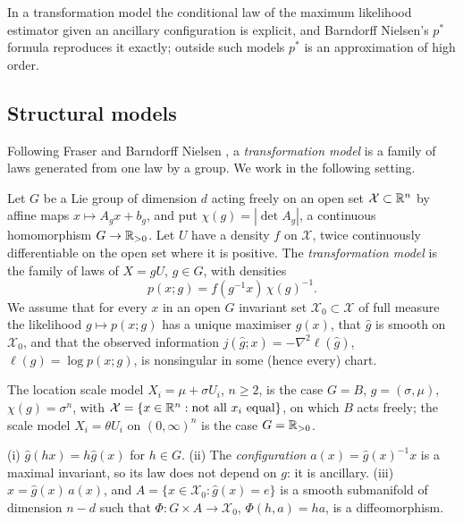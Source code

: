 In a transformation model the conditional law of the maximum likelihood estimator given an ancillary configuration is explicit, and Barndorff Nielsen's $p^*$ formula reproduces it exactly; outside such models $p^*$ is an approximation of high order.

\subsection{Structural models}

Following Fraser \cite{fraser1968} and Barndorff Nielsen \cite{barndorffnielsen1983,barndorffnielsencox1994}, a \emph{transformation model} is a family of laws generated from one law by a group. We work in the following setting.

\begin{definition}\label{def:11bmodel}
Let $G$ be a Lie group of dimension $d$ acting freely on an open set $\mathcal X\subset\mathbb{R}^n$ by affine maps $x\mapsto A_gx+b_g$, and put $\chi(g)=|\det A_g|$, a continuous homomorphism $G\to\mathbb{R}_{>0}$. Let $U$ have a density $f$ on $\mathcal X$, twice continuously differentiable on the open set where it is positive. The \emph{transformation model} is the family of laws of $X=gU$, $g\in G$, with densities
\[
p(x;g)=f(g^{-1}x)\,\chi(g)^{-1}.
\]
We assume that for every $x$ in an open $G$ invariant set $\mathcal X_0\subset\mathcal X$ of full measure the likelihood $g\mapsto p(x;g)$ has a unique maximiser $\hat g(x)$, that $\hat g$ is smooth on $\mathcal X_0$, and that the observed information $j(\hat g;x)=-\nabla^2\ell(\hat g)$, $\ell(g)=\log p(x;g)$, is nonsingular in some (hence every) chart.
\end{definition}

The location scale model $X_i=\mu+\sigma U_i$, $n\ge2$, is the case $G=B$, $g=(\sigma,\mu)$, $\chi(g)=\sigma^n$, with $\mathcal X=\{x\in\mathbb{R}^n:\text{not all }x_i\text{ equal}\}$, on which $B$ acts freely; the scale model $X_i=\theta U_i$ on $(0,\infty)^n$ is the case $G=\mathbb{R}_{>0}$.

\begin{lemma}\label{thm:11bconfig}
(i) $\hat g(hx)=h\hat g(x)$ for $h\in G$. (ii) The \emph{configuration} $a(x)=\hat g(x)^{-1}x$ is a maximal invariant, so its law does not depend on $g$: it is ancillary. (iii) $x=\hat g(x)\,a(x)$, and $A=\{x\in\mathcal X_0:\hat g(x)=e\}$ is a smooth submanifold of dimension $n-d$ such that $\Phi:G\times A\to\mathcal X_0$, $\Phi(h,a)=ha$, is a diffeomorphism.
\end{lemma}


